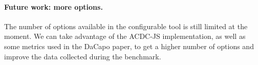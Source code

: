 \documentclass[10pt, sigplan]{acmart}
\begin{document}
\paragraph{Future work: more options.}
The number of options available in the configurable tool is still limited at the moment. We can take advantage of the ACDC-JS implementation, as well as some metrics used in the DaCapo paper, to get a higher number of options and improve the data collected during the benchmark.



\end{document}
